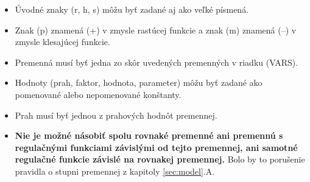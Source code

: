\documentclass[11pt,final,oneside]{fithesis}
\begin{document}
\begin{enumerate}
\begin{itemize}
funkcie:
\begin{itemize}
\item rpcoor(premenn\'a, prah1, prah2, hodnota1, hodnota2), \\rmcoor(premenn\'a, prah1, prah2, hodnota1, hodnota2),
\item rp(premenn\'a, prah1, prah2, parameter1, parameter2),\\rm(premenn\'a, prah1, prah2, parameter1, parameter2),
\item hp(premenn\'a, prah, parameter1, parameter2),\\hm(premenn\'a, prah, parameter1, parameter2),
\item sp(premenn\'a, faktor, prah, parameter1, parameter2),\\sm(premenn\'a, faktor, prah, parameter1, parameter2),
\item spinv(premenn\'a, faktor, prah, parameter1, parameter2),\\sminv(premenn\'a, faktor, prah, parameter1, parameter2),
\item hillp(premenn\'a, prah, faktor, parameter1, parameter2),\\hillm(premenn\'a, prah, faktor, parameter1, parameter2),
\end{itemize}
\item \' Uvodn\'e znaky (r, h, s) m\^ o\v zu by\v t zadan\'e aj ako ve\v lk\'e p\'ismen\'a.
\item Znak (p) znamen\'a (+) v zmysle rast\'ucej funkcie a znak (m) znamen\'a (--) v zmysle klesaj\'ucej funkcie.
\item Premenn\'a mus\'i by\v t jedna zo sk\^ or uveden\'ych premenn\'ych v riad\-ku (VARS).
\item Hodnoty (prah, faktor, hodnota, parameter) m\^ o\v zu by\v t zadan\'e ako pomenovan\'e alebo nepomenovan\'e kon\v stanty.
\item Prah mus\'i by\v t jednou z prahov\'ych hodn\^ ot premennej.
\item \textbf{Nie je mo\v zn\'e n\'asobi\v t spolu rovnak\'e premenn\'e ani premenn\'u s regula\v cn\'ymi funkciami z\'avisl\'ymi od tejto premennej, ani
samotn\'e regula\v cn\'e funkcie z\'avisl\'e na rovnakej premennej.} Bolo by to poru\v senie pravidla o stupni premennej z kapitoly \ref{sec:model}.A.
\end{itemize}
\end{enumerate}

\end{document}
